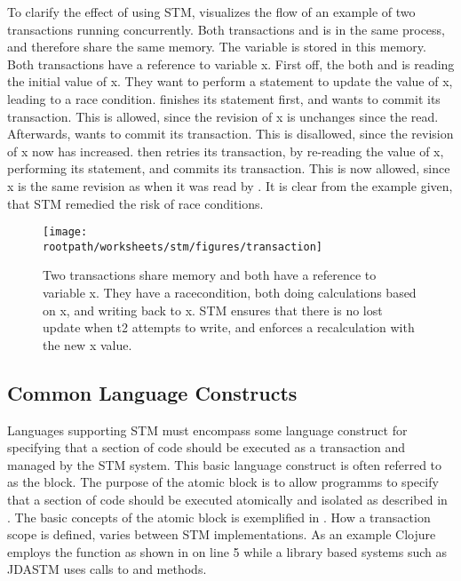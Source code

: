 To clarify the effect of using \ac{STM},  visualizes the flow of an example of two transactions running concurrently. Both transactions  and  is in the same process, and therefore share the same memory. The variable  is stored in this memory. Both transactions have a reference to variable x. First off, the both  and  is reading the initial value of x. They want to perform a statement to update the value of x, leading to a race condition.  finishes its statement first, and wants to commit its transaction. This is allowed, since the revision of x is unchanges since the read. Afterwards,  wants to commit its transaction. This is disallowed, since the revision of x now has increased.  then retries its transaction, by re-reading the value of x, performing its statement, and commits its transaction. This is now allowed, since x is the same revision as when it was read by . It is clear from the example given, that \ac{STM} remedied the risk of race conditions.

\begin{figure}[h!]
\centering
\texttt{[image: \\rootpath/worksheets/stm/figures/transaction]}
\caption{Two transactions share memory and both have a reference to variable x. They have a racecondition, both doing calculations based on x, and writing back to x. \ac{STM} ensures that there is no lost update when t2 attempts to write, and enforces a recalculation with the new x value.}\label{fig:transaction}
\end{figure}

\subsection{Common Language Constructs}
\label{sec:stm_common_constructs}
Languages supporting \ac{STM} must encompass some language construct for specifying that a section of code should be executed as a transaction and managed by the \ac{STM} system. This basic language construct is often referred to as the  block\cite[p. 49]{harris2005composable}\cite[p. 3]{harris2003language}. The purpose of the atomic block is to allow programms to specify that a section of code should be executed atomically and isolated as described in . The basic concepts of the atomic block is exemplified in . How a transaction scope is defined, varies between \ac{STM} implementations. As an example Clojure employs the  function as shown in  on line 5 while a library based systems such as JDASTM\cite{ramadan2009committing} uses calls to  and  methods.

